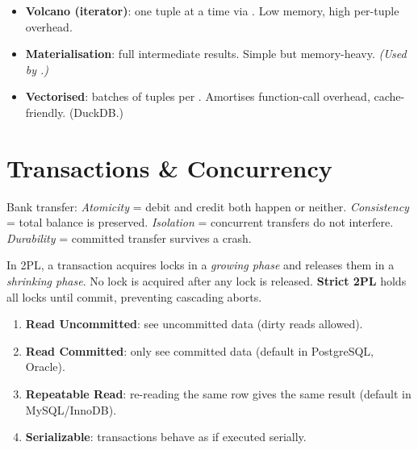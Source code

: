 \begin{interviewbox}
\begin{itemize}[nosep]
  \item \textbf{Volcano (iterator)}: one tuple at a time via .  Low memory, high per-tuple overhead.
  \item \textbf{Materialisation}: full intermediate results.  Simple but memory-heavy.  \emph{(Used by \shiftdb{}.)}
  \item \textbf{Vectorised}: batches of tuples per .  Amortises function-call overhead, cache-friendly.  (DuckDB.)
\end{itemize}
\end{interviewbox}

\section{Transactions \& Concurrency}

\begin{interviewbox}
Bank transfer: \emph{Atomicity} = debit and credit both happen or neither.  \emph{Consistency} = total balance is preserved.  \emph{Isolation} = concurrent transfers do not interfere.  \emph{Durability} = committed transfer survives a crash.
\end{interviewbox}

\begin{interviewbox}
In 2PL, a transaction acquires locks in a \emph{growing phase} and releases them in a \emph{shrinking phase}.  No lock is acquired after any lock is released.  \textbf{Strict 2PL} holds all locks until commit, preventing cascading aborts.
\end{interviewbox}

\begin{interviewbox}
\begin{enumerate}[nosep]
  \item \textbf{Read Uncommitted}: see uncommitted data (dirty reads allowed).
  \item \textbf{Read Committed}: only see committed data (default in PostgreSQL, Oracle).
  \item \textbf{Repeatable Read}: re-reading the same row gives the same result (default in MySQL/InnoDB).
  \item \textbf{Serializable}: transactions behave as if executed serially.
\end{enumerate}
\end{interviewbox}

